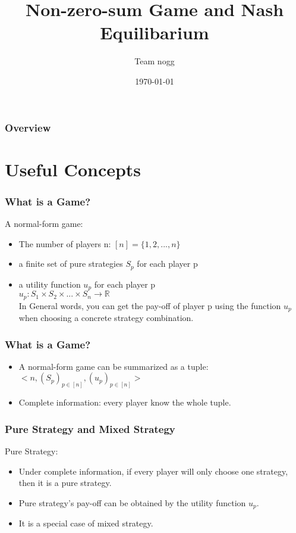 \documentclass{beamer}
\title[Short title]{Non-zero-sum Game and Nash Equilibarium}
\author{Team nogg}
\institute[SJTU]
{

}
\date{\today}
\begin{document}
\begin{frame}
\titlepage
\end{frame}

\begin{frame}
\frametitle{Overview}
\tableofcontents
\end{frame}


\section{Useful Concepts}
\begin{frame}
\frametitle{What is a Game?}
A normal-form game:\\
\begin{itemize}
\item The {\color{red} number} of players n: $[n] = \{1,2,...,n\}$
\item a finite {\color{red} set of pure strategies} $S_p$ for each player p
\item a {\color{red} utility function} $u_p$ for each player p\\
        \qquad $u_p : S_1 \times S_2 \times ... \times S_n  \rightarrow \mathbb{R}$\\
        In General words, you can get the pay-off of player p using the function $u_p$ when choosing a concrete strategy combination.
\end{itemize}
\end{frame}

\begin{frame}
\frametitle{What is a Game?}
\begin{itemize}
\item A normal-form game can be summarized as a tuple:\\
        \qquad $<n, (S_p)_{p\in [n]}, (u_p)_{p\in [n]}>$
\item Complete information: every player know the whole tuple.
\end{itemize}

\end{frame}

\begin{frame}
\frametitle{Pure Strategy and Mixed Strategy}
Pure Strategy:\\
\begin{itemize}
\item Under complete information, if every player will only choose one strategy, then it is a pure strategy.
\item Pure strategy's pay-off can be obtained by the utility function $u_p$.
\item It is a special case of mixed strategy.
\end{itemize}
\end{frame}
\end{document}
